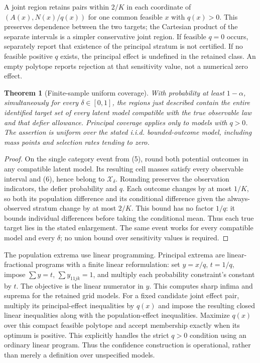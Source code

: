 \documentclass[11pt,a4paper]{article}
\newtheorem{theorem}{Theorem}[section]
\begin{document}
A joint region retains pairs within $2/K$ in each coordinate of
$(A(x),N(x)/q(x))$ for one common feasible $x$ with $q(x)>0$. This preserves dependence between the two targets; the Cartesian product of the separate intervals is a simpler conservative joint region. If feasible $q=0$ occurs, separately report that existence of the principal stratum is not certified. If no feasible positive $q$ exists, the principal effect is undefined in the retained class. An empty polytope reports rejection at that sensitivity value, not a numerical zero effect.

\begin{theorem}[Finite-sample uniform coverage]
With probability at least $1-\alpha$, simultaneously for every $\delta\in[0,1]$, the regions just described contain the entire identified target set of every latent model compatible with the true observable law and that defier allowance. Principal coverage applies only to models with $q>0$. The assertion is uniform over the stated i.i.d. bounded-outcome model, including mass points and selection rates tending to zero.
\end{theorem}
\begin{proof}
On the single category event from (5), round both potential outcomes in any compatible latent model. Its resulting cell masses satisfy every observable interval and (6), hence belong to $\mathcal X_\delta$. Rounding preserves the observation indicators, the defier probability and $q$. Each outcome changes by at most $1/K$, so both its population difference and its conditional difference given the always-observed stratum change by at most $2/K$. This bound has no factor $1/q$: it bounds individual differences before taking the conditional mean. Thus each true target lies in the stated enlargement. The same event works for every compatible model and every $\delta$; no union bound over sensitivity values is required.
\end{proof}

The population extrema use linear programming. Principal extrema are linear-fractional programs with a finite linear reformulation: set $y=x/q$, $t=1/q$, impose $\sum y=t$, $\sum y_{11jk}=1$, and multiply each probability constraint's constant by $t$. The objective is the linear numerator in $y$. This computes sharp infima and suprema for the retained grid models. For a fixed candidate joint effect pair, multiply its principal-effect inequalities by $q(x)$ and impose the resulting closed linear inequalities along with the population-effect inequalities. Maximize $q(x)$ over this compact feasible polytope and accept membership exactly when its optimum is positive. This explicitly handles the strict $q>0$ condition using an ordinary linear program. Thus the confidence construction is operational, rather than merely a definition over unspecified models.
\end{document}
